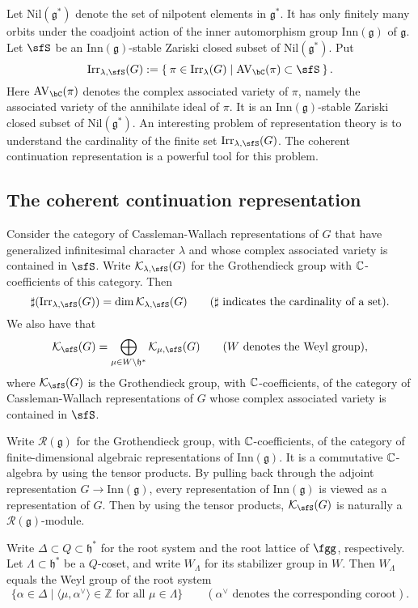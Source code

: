 \documentclass[12pt,a4paper]{amsart}
\newcommand{\AVC}{\mathrm{AV}_\bC}
\newcommand{\CK}{{\mathcal {K}}}
\newcommand{\g}{\mathfrak g}
\newcommand{\h}{\mathfrak h}
\newcommand{\Z}{\mathbb{Z}}
\numberwithin{equation}{section}
\theoremstyle{remark}
\def\Irr{\mathrm{Irr}}
\begin{document}
Let $\mathrm{Nil}(\g^*)$ denote the set of nilpotent elements in $\g^*$. It has only finitely many orbits under the coadjoint action of the inner automorphism group $\mathrm{Inn}(\g)$ of $\g$. Let $\sfS$ be an  $\mathrm{Inn}(\g)$-stable Zariski closed subset of $\mathrm{Nil}(\g^*)$. Put
\[
  \Irr_{\lambda,\sfS}(G):=\Set{\pi \in \Irr_{\lambda}(G)| \text{$\AVC(\pi)\subset \sfS$} }.
\]
Here $\AVC(\pi)$ denotes the complex associated variety of $\pi$, namely the associated variety of the annihilate ideal of $\pi$. It is an  $\mathrm{Inn}(\g)$-stable Zariski closed subset of $\mathrm{Nil}(\g^*)$. 
An interesting  problem of representation theory is to understand the cardinality of the finite set $\Irr_{\lambda,\sfS}(G)$. 
The coherent continuation representation is a powerful tool for this problem.

\subsection{The coherent continuation representation}


Consider the category of Cassleman-Wallach representations of $G$ that have generalized infinitesimal character $\lambda$ and whose complex associated variety is contained in $\sfS$. 
Write  $\CK_{\lambda,\sfS}(G)$ for the  Grothendieck group with $\mathbb{C}$-coefficients  of this category. Then
\[
  \sharp (\Irr_{\lambda,\sfS}(G))=\dim \CK_{\lambda,\sfS}(G)\qquad(\sharp\textrm{ indicates the cardinality of a set}).
\]
We also have that
\[
  \CK_\sfS(G)=\bigoplus_{\mu\in W\backslash  \h^*} \CK_{\mu,\sfS}(G)\qquad (W\textrm{ denotes the Weyl group}),
\]
where $\CK_{\sfS}(G)$ is  the Grothendieck group, with $\mathbb{C}$-coefficients,  of the category of Cassleman-Wallach representations of $G$ whose complex associated variety is contained in $\sfS$. 


Write $\mathcal R(\g)$ for the Grothendieck group, with $\mathbb{C}$-coefficients,  of the category of finite-dimensional algebraic representations of $\mathrm{Inn}(\g)$. It is a commutative $\mathbb{C}$-algebra by using the tensor products. By pulling back through the adjoint representation $G\rightarrow \mathrm{Inn}(\g)$, every representation of $\mathrm{Inn}(\g)$ is viewed as a representation of $G$. Then by using the tensor products, $\CK_\sfS(G)$ is naturally a $\mathcal R(\g)$-module.






Write $\Delta\subset Q\subset \h^*$ for the root system and the root lattice of $\fgg$, respectively. Let $\Lambda\subset \h^*$ be a $Q$-coset, and write $W_\Lambda$ for its stabilizer group in $W$. Then $W_\Lambda$ equals the Weyl group of the root system
\[
  \{\alpha \in \Delta\mid \langle \mu, \alpha^\vee\rangle \in \Z\textrm{ for all }\mu\in \Lambda\}\qquad (\alpha^\vee \textrm{ denotes the corresponding coroot}). 
\]
\end{document}

